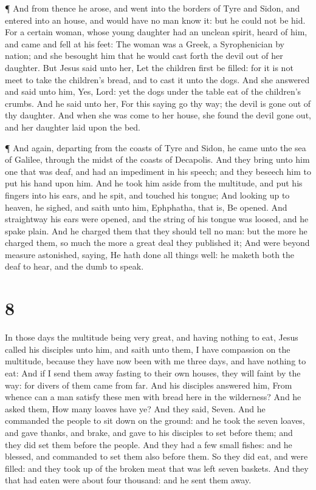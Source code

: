  ¶ And from thence he arose, and went into the borders of
Tyre and Sidon, and entered into an house, and would have no man know
it: but he could not be hid.  For a certain woman, whose
young daughter had an unclean spirit, heard of him, and came and fell at
his feet:  The woman was a Greek, a Syrophenician by
nation; and she besought him that he would cast forth the devil out of
her daughter.  But Jesus said unto her, Let the children
first be filled: for it is not meet to take the children's bread, and to
cast it unto the dogs.  And she answered and said unto him,
Yes, Lord: yet the dogs under the table eat of the children's crumbs.
 And he said unto her, For this saying go thy way; the
devil is gone out of thy daughter.  And when she was come
to her house, she found the devil gone out, and her daughter laid upon
the bed.

 ¶ And again, departing from the coasts of Tyre and Sidon,
he came unto the sea of Galilee, through the midst of the coasts of
Decapolis.  And they bring unto him one that was deaf, and
had an impediment in his speech; and they beseech him to put his hand
upon him.  And he took him aside from the multitude, and
put his fingers into his ears, and he spit, and touched his tongue;
 And looking up to heaven, he sighed, and saith unto him,
Ephphatha, that is, Be opened.  And straightway his ears
were opened, and the string of his tongue was loosed, and he spake
plain.  And he charged them that they should tell no man:
but the more he charged them, so much the more a great deal they
published it;  And were beyond measure astonished, saying,
He hath done all things well: he maketh both the deaf to hear, and the
dumb to speak.

\hypertarget{section-7}{%
\section{8}\label{section-7}}

 In those days the multitude being very great, and having
nothing to eat, Jesus called his disciples unto him, and saith unto
them,  I have compassion on the multitude, because they have
now been with me three days, and have nothing to eat:  And
if I send them away fasting to their own houses, they will faint by the
way: for divers of them came from far.  And his disciples
answered him, From whence can a man satisfy these men with bread here in
the wilderness?  And he asked them, How many loaves have ye?
And they said, Seven.  And he commanded the people to sit
down on the ground: and he took the seven loaves, and gave thanks, and
brake, and gave to his disciples to set before them; and they did set
them before the people.  And they had a few small fishes:
and he blessed, and commanded to set them also before them. 
So they did eat, and were filled: and they took up of the broken meat
that was left seven baskets.  And they that had eaten were
about four thousand: and he sent them away.

